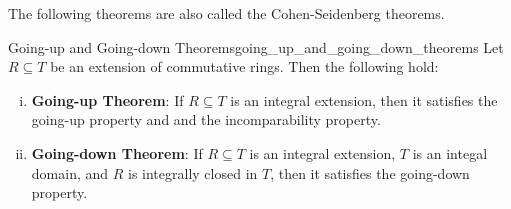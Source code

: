 The following theorems are also called the Cohen-Seidenberg theorems.
\begin{theorem}{Going-up and Going-down Theorems}{going_up_and_going_down_theorems}
    Let $R\subseteq T$ be an extension of commutative rings. Then the following hold:
    \begin{enumerate}[(i)]
        \item \textbf{Going-up Theorem}: If $R\subseteq T$ is an integral extension, then it satisfies the going-up property and and the incomparability property.
        \item \textbf{Going-down Theorem}: If $R\subseteq T$ is an integral extension, $T$ is an integal domain, and $R$ is integrally closed in $T$, then it satisfies the going-down property.
    \end{enumerate}
    
\end{theorem}
